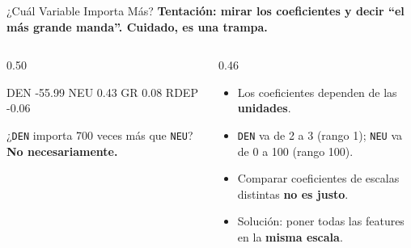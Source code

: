 \documentclass[aspectratio=169, 11pt]{beamer}
\begin{document}
\begin{frame}[fragile,shrink=12]{¿Cuál Variable Importa Más?}
  \vspace{-4pt}
  {\small\color{arcaDark}\bfseries
    Tentación: mirar los coeficientes y decir ``el más grande manda''. \textbf{Cuidado, es una trampa.}}

  \vspace{4pt}
  \begin{columns}[T]
    \begin{column}{0.50\textwidth}
      \begin{outputblock}[title={\small\faTerminal\hspace{6pt}coeficientes crudos}]
DEN    -55.99
NEU      0.43
GR       0.08
RDEP    -0.06
      \end{outputblock}
      \vspace{3pt}
      {\scriptsize\color{textMuted}
        ¿\texttt{DEN} importa 700 veces más que \texttt{NEU}?
        \textbf{No necesariamente.}}
    \end{column}
    \begin{column}{0.46\textwidth}
      {\footnotesize\color{textMuted}
      \begin{itemize}\setlength{\itemsep}{6pt}
        \item[{\color{arcaRed}\scriptsize\faBalanceScale}]
          Los coeficientes dependen de las \textbf{unidades}.
        \item[{\color{arcaRed}\scriptsize\faArrowRight}]
          \texttt{DEN} va de 2 a 3 (rango 1);
          \texttt{NEU} va de 0 a 100 (rango 100).
        \item[{\color{arcaRed}\scriptsize\faArrowRight}]
          Comparar coeficientes de escalas distintas
          \textbf{no es justo}.
        \item[{\color{codeGreen}\scriptsize\faLightbulb}]
          Solución: poner todas las features en la
          \textbf{misma escala}.
      \end{itemize}
      }
    \end{column}
  \end{columns}
\end{frame}
\end{document}
